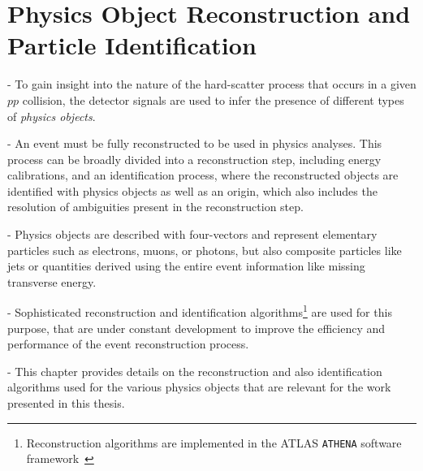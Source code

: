 
\chapter{Physics Object Reconstruction and Particle Identification}
\label{chap:objects}

- To gain insight into the nature of the hard-scatter process that occurs in a given $pp$ collision, the detector signals are used to infer the presence of different types of \emph{physics objects}.

- An event must be fully reconstructed to be used in physics analyses. This process can be broadly divided into a reconstruction step, including energy calibrations, and an identification process, where the reconstructed objects are identified with physics objects as well as an origin, which also includes the resolution of ambiguities present in the reconstruction step.

- Physics objects are described with four-vectors and represent elementary particles such as electrons, muons, or photons, but also composite particles like jets or quantities derived using the entire event information like missing transverse energy.

- Sophisticated reconstruction and identification algorithms\footnote{Reconstruction algorithms are implemented in the ATLAS \texttt{ATHENA} software framework~\cite{ATLAS-TDR-17}} are used for this purpose, that are under constant development to improve the efficiency and performance of the event reconstruction process.

- This chapter provides details on the reconstruction and also identification algorithms used for the various physics objects that are relevant for the work presented in this thesis.




